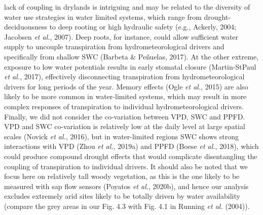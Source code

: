\documentclass[11pt,twoside]{reedthesis}
\begin{document}
lack of coupling in drylands is intriguing and may be related to the
diversity of water use strategies in water limited systems, which range
from drought-deciduousness to deep rooting or high hydraulic safety
(e.g., Ackerly, 2004; Jacobsen \emph{et al.}, 2007). Deep roots, for
instance, could allow sufficient water supply to uncouple transpiration
from hydrometeorological drivers and specifically from shallow SWC
(Barbeta \& Peñuelas, 2017). At the other extreme, exposure to low water
potentials results in early stomatal closure (Martin-StPaul \emph{et
al.}, 2017), effectively disconnecting transpiration from
hydrometeorological drivers for long periods of the year. Memory effects
(Ogle \emph{et al.}, 2015) are also likely to be more common in
water-limited systems, which may result in more complex responses of
transpiration to individual hydrometeorological drivers. Finally, we did
not consider the co-variation between VPD, SWC and PPFD. VPD and SWC
co-variation is relatively low at the daily level at large spatial
scales (Novick \emph{et al.}, 2016), but in water-limited regions SWC
shows strong interactions with VPD (Zhou \emph{et al.}, 2019a) and PPFD
(Boese \emph{et al.}, 2018), which could produce compound drought
effects that would complicate disentangling the coupling of
transpiration to individual drivers. It should also be noted that we
focus here on relatively tall woody vegetation, as this is the one
likely to be measured with sap flow sensors (Poyatos \emph{et al.},
2020b), and hence our analysis excludes extremely arid sites likely to
be totally driven by water availability (compare the grey areas in our
Fig. 4.3 with Fig. 4.1 in Running \emph{et al.} (2004)).\par
\end{document}
